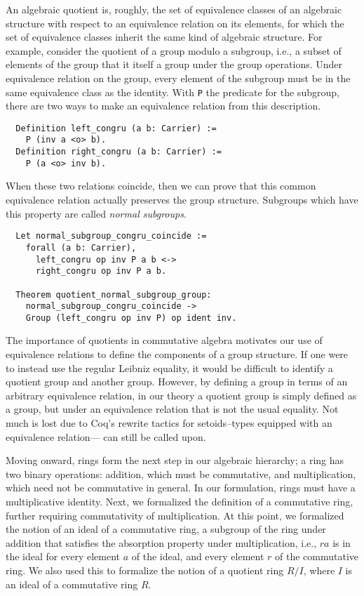\documentclass{article}
\begin{document}
An algebraic quotient is, roughly, the set of equivalence classes of an
algebraic structure with respect to an equivalence relation on its elements,
for which the set of equivalence classes inherit the same kind of algebraic
structure. For example, consider the quotient of a group modulo a subgroup,
i.e., a subset of elements of the group that it itself a group under the group
operations. Under equivalence relation on the group, every element of the
subgroup must be in the same equivalence class as the identity. With \texttt{P}
the predicate for the subgroup, there are two ways to make an equivalence
relation from this description.

\begin{verbatim}
  Definition left_congru (a b: Carrier) :=
    P (inv a <o> b).
  Definition right_congru (a b: Carrier) :=
    P (a <o> inv b).
\end{verbatim}

When these two relations coincide, then we can prove that this common
equivalence relation actually preserves the group structure. Subgroups which
have this property are called \emph{normal subgroups}.

\begin{verbatim}
  Let normal_subgroup_congru_coincide :=
    forall (a b: Carrier),
      left_congru op inv P a b <->
      right_congru op inv P a b.

  Theorem quotient_normal_subgroup_group:
    normal_subgroup_congru_coincide ->
    Group (left_congru op inv P) op ident inv.
\end{verbatim}

The importance of quotients in commutative algebra motivates our use of
equivalence relations to define the components of a group structure. If one
were to instead use the regular Leibniz equality, it would be difficult to
identify a quotient group and another group. However, by  defining a group in
terms of an arbitrary equivalence relation, in our theory a quotient group is 
simply defined as a group, but under an equivalence relation that is not the usual 
equality. 
Not much is lost due to Coq's rewrite tactics for setoids--types equipped with an equivalence relation---
can still be called upon.

Moving onward, rings form the next step in our algebraic hierarchy; a ring has
two binary operations: addition, which must be commutative, and multiplication,
which need not be commutative in general. In our formulation, rings must have a
multiplicative identity. Next, we formalized the definition of a commutative
ring, further requiring commutativity of multiplication. At this point, we
formalized the notion of an ideal of a commutative ring, a subgroup of the ring
under addition that satisfies the absorption property under multiplication,
i.e., \(r a\) is in the ideal for every element \(a\) of the ideal, and every
element \(r\) of the commutative ring. We also used this to formalize the
notion of a quotient ring $R/I$, where $I$ is an ideal of a commutative ring
$R$.
\end{document}
